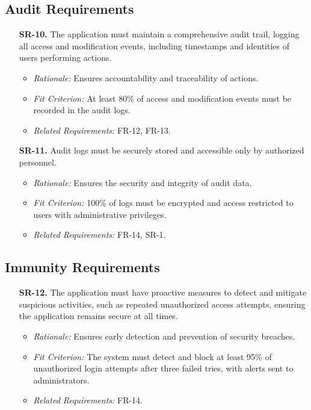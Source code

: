 \documentclass[12pt]{article}
\begin{document}
\subsection{Audit Requirements}
\begin{enumerate}
  \item[\textbf{SR-10.}] The application must maintain a comprehensive audit 
  trail, logging all access and modification events, including timestamps and 
  identities of users performing actions.
  \begin{itemize}
    \item \textit{Rationale:} Ensures accountability and traceability of 
    actions.
    \item \textit{Fit Criterion:} At least 80\% of access and modification 
    events must be recorded in the audit logs.
    \item \textit{Related Requirements:} FR-12, FR-13.
  \end{itemize}

  \item[\textbf{SR-11.}] Audit logs must be securely stored and accessible only 
  by authorized personnel.
  \begin{itemize}
    \item \textit{Rationale:} Ensures the security and integrity of audit data.
    \item \textit{Fit Criterion:} 100\% of logs must be encrypted and access 
    restricted to users with administrative privileges.
    \item \textit{Related Requirements:} FR-14, SR-1.
  \end{itemize}
\end{enumerate}

\subsection{Immunity Requirements}
\begin{enumerate}
  \item[\textbf{SR-12.}] The application must have proactive measures to detect 
  and mitigate suspicious activities, such as repeated unauthorized access 
  attempts, ensuring the application remains secure at all times.
  \begin{itemize}
    \item \textit{Rationale:} Ensures early detection and prevention of security 
    breaches.
    \item \textit{Fit Criterion:} The system must detect and block at least 95\% 
    of unauthorized login attempts after three failed tries, with alerts sent to 
    administrators.
    \item \textit{Related Requirements:} FR-14.
  \end{itemize}
\end{enumerate}
\end{document}
